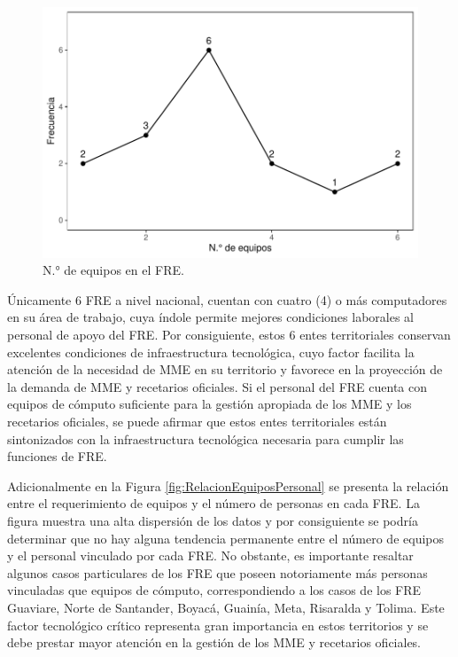 \documentclass[
]{book}
\begin{document}
\begin{figure}

{\centering \includegraphics[width=0.85\linewidth]{InformeFinal_files/figure-latex/EquiposComputo-1} 

}

\caption{N.° de equipos en el FRE.}\label{fig:EquiposComputo}
\end{figure}

Únicamente 6 FRE a nivel nacional, cuentan con cuatro (4) o más computadores en su área de trabajo, cuya índole permite mejores condiciones laborales al personal de apoyo del FRE. Por consiguiente, estos 6 entes territoriales conservan excelentes condiciones de infraestructura tecnológica, cuyo factor facilita la atención de la necesidad de MME en su territorio y favorece en la proyección de la demanda de MME y recetarios oficiales. Si el personal del FRE cuenta con equipos de cómputo suficiente para la gestión apropiada de los MME y los recetarios oficiales, se puede afirmar que estos entes territoriales están sintonizados con la infraestructura tecnológica necesaria para cumplir las funciones de FRE.

Adicionalmente en la Figura \ref{fig:RelacionEquiposPersonal} se presenta la relación entre el requerimiento de equipos y el número de personas en cada FRE. La figura muestra una alta dispersión de los datos y por consiguiente se podría determinar que no hay alguna tendencia permanente entre el número de equipos y el personal vinculado por cada FRE. No obstante, es importante resaltar algunos casos particulares de los FRE que poseen notoriamente más personas vinculadas que equipos de cómputo, correspondiendo a los casos de los FRE Guaviare, Norte de Santander, Boyacá, Guainía, Meta, Risaralda y Tolima. Este factor tecnológico crítico representa gran importancia en estos territorios y se debe prestar mayor atención en la gestión de los MME y recetarios oficiales.
\end{document}
